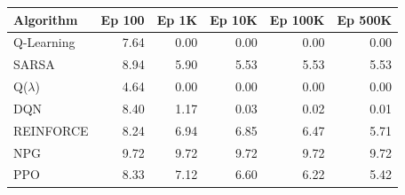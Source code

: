 \begin{tabular}{lrrrrr}
\hline
Algorithm & Ep 100 & Ep 1K & Ep 10K & Ep 100K & Ep 500K \\
\hline
Q-Learning & 7.64 & 0.00 & 0.00 & 0.00 & 0.00 \\
SARSA & 8.94 & 5.90 & 5.53 & 5.53 & 5.53 \\
Q($\lambda$) & 4.64 & 0.00 & 0.00 & 0.00 & 0.00 \\
DQN & 8.40 & 1.17 & 0.03 & 0.02 & 0.01 \\
REINFORCE & 8.24 & 6.94 & 6.85 & 6.47 & 5.71 \\
NPG & 9.72 & 9.72 & 9.72 & 9.72 & 9.72 \\
PPO & 8.33 & 7.12 & 6.60 & 6.22 & 5.42 \\
\hline
\end{tabular}